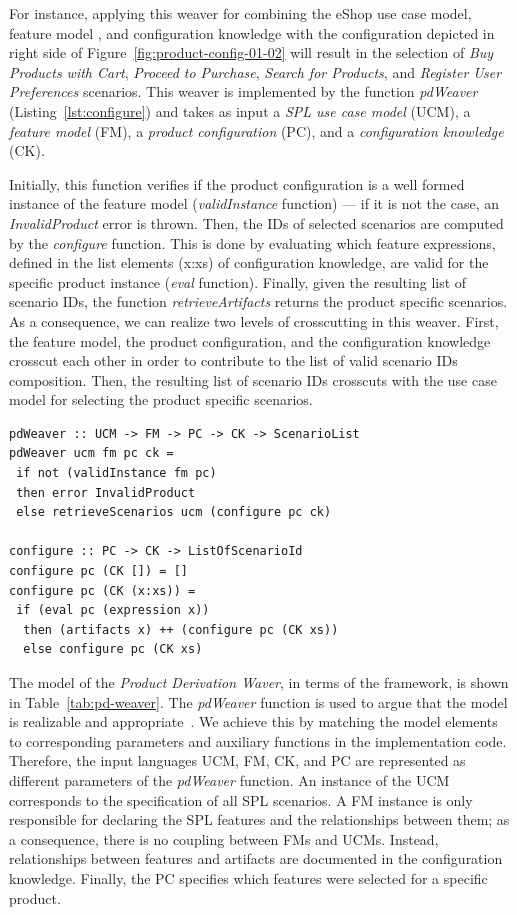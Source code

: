 \documentclass{report}
\begin{document}
\begin{frontmatter}
For instance, applying this weaver for combining the eShop use case model, feature model , and configuration knowledge with the configuration depicted in right side of Figure~\ref{fig:product-config-01-02} will result in the selection of  \emph{Buy Products with Cart}, \emph{Proceed to Purchase}, \emph{Search for Products}, and \emph{Register User Preferences} scenarios.  
 This weaver is implemented by the function \emph{pdWeaver} (Listing~\ref{lst:configure}) and takes as input 
a \emph{SPL use case model} (UCM), a \emph{feature model} (FM), a \emph{product configuration} (PC), and a \emph{configuration knowledge} (CK). 

Initially, this function verifies if the product configuration is a well formed instance of the feature model (\emph{validInstance} function) --- if it is not the case,  an \emph{InvalidProduct} error is thrown. Then, the IDs of selected scenarios are computed by the \emph{configure} function. This is done by evaluating which feature expressions, defined in the list elements (x:xs) of configuration knowledge, are valid for the specific product instance (\emph{eval} function). Finally, given the resulting list of scenario IDs, the function \emph{retrieveArtifacts} returns the product specific scenarios. 
As a consequence, we can realize two levels of crosscutting in this weaver. First, the feature model, the product configuration, and the configuration knowledge crosscut each other in order to contribute to the list of valid scenario IDs composition. Then, the resulting list of scenario IDs crosscuts with the use case model for selecting the product specific scenarios.    

\begin{lstlisting}[belowskip=20pt,frame=tb,caption={Product derivation weaver function},label=lst:configure]
pdWeaver :: UCM -> FM -> PC -> CK -> ScenarioList
pdWeaver ucm fm pc ck = 
 if not (validInstance fm pc) 
 then error InvalidProduct
 else retrieveScenarios ucm (configure pc ck)

configure :: PC -> CK -> ListOfScenarioId
configure pc (CK []) = []
configure pc (CK (x:xs)) =
 if (eval pc (expression x))
  then (artifacts x) ++ (configure pc (CK xs))
  else configure pc (CK xs)
\end{lstlisting}

The model of the \emph{Product Derivation Waver}, 
in terms of the framework, is shown in Table~\ref{tab:pd-weaver}. The \emph{pdWeaver} function is used to argue that the model is realizable and appropriate~\cite{kiczales-ecoop-2003}. We achieve this by matching the model elements 
to corresponding parameters and auxiliary functions in the implementation code. Therefore, the input languages UCM, FM, CK, and PC are represented as different parameters 
of the \emph{pdWeaver} function. An instance of the UCM corresponds to the specification of all 
SPL scenarios. A FM instance is only responsible for declaring the SPL features and the relationships between 
them; as a consequence, there is no coupling between FMs and UCMs. Instead, relationships between features and artifacts are documented in the configuration knowledge. Finally, the PC specifies which features were selected 
for a specific product. 


\end{frontmatter}
\end{document}
